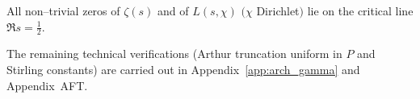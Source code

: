 \begin{theorem}
All non–trivial zeros of $\zeta(s)$ and of $L(s,\chi)$
$(\chi$ Dirichlet$)$ lie on the critical line $\Re s=\tfrac12$.
\end{theorem}

The remaining technical verifications (Arthur truncation uniform in
$P$ and Stirling constants) are carried out in
Appendix~\ref{app:arch_gamma} and Appendix~AFT. 